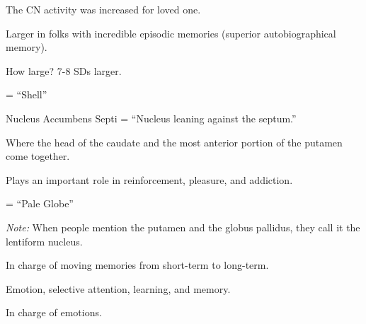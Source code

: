 \begin{coloredlist}
\begin{coloredlist}
\begin{coloredlist}
\begin{coloredlist}
\begin{coloredlist}
                    \item The CN activity was increased for loved one.
                \end{coloredlist}
            \end{coloredlist}
            \item Larger in folks with incredible episodic memories (superior autobiographical memory).
            \begin{coloredlist}
                \item How large? 7-8 SDs larger.
            \end{coloredlist}
        \end{coloredlist}
        \item {} = ``Shell''
        \item {}
        \begin{coloredlist}
            \item Nucleus Accumbens Septi = ``Nucleus leaning against the septum.''
            \begin{coloredlist}
                \item Where the head of the caudate and the most anterior portion of the putamen come together.
                \item Plays an important role in reinforcement, pleasure, and addiction.
            \end{coloredlist}
        \end{coloredlist}
    \end{coloredlist}
    \item {} = ``Pale Globe''
    \item \textit{Note:} When people mention the putamen and the globus pallidus, they call it the lentiform nucleus.
    \item {}
    \begin{coloredlist}
        \item {}
        \begin{coloredlist}
            \item In charge of moving memories from short-term to long-term.
            \item Emotion, selective attention, learning, and memory.
        \end{coloredlist}
        \item {}
        \begin{coloredlist}
            \item In charge of emotions.

\end{coloredlist}
\end{coloredlist}
\end{coloredlist}
